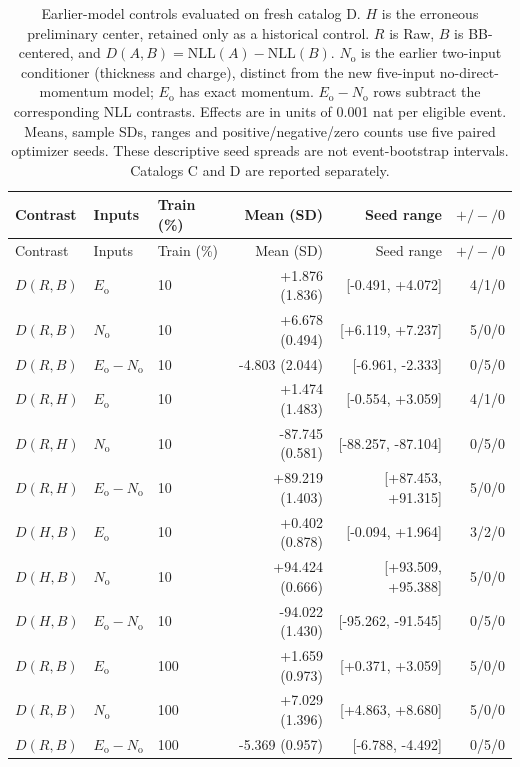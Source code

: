 \begingroup
\small
\setlength{\tabcolsep}{3pt}
\begin{longtable}{lllrrr}
\caption{Earlier-model controls evaluated on fresh catalog D. $H$ is the erroneous preliminary center, retained only as a historical control. $R$ is Raw, $B$ is BB-centered, and $D(A,B)=\mathrm{NLL}(A)-\mathrm{NLL}(B)$. $N_{\mathrm{o}}$ is the earlier two-input conditioner (thickness and charge), distinct from the new five-input no-direct-momentum model; $E_{\mathrm{o}}$ has exact momentum. $E_{\mathrm{o}}-N_{\mathrm{o}}$ rows subtract the corresponding NLL contrasts. Effects are in units of 0.001 nat per eligible event. Means, sample SDs, ranges and positive/negative/zero counts use five paired optimizer seeds. These descriptive seed spreads are not event-bootstrap intervals. Catalogs C and D are reported separately.}\label{tab:editorial-secondary-historical-D}\\
\toprule Contrast & Inputs & Train (\%) & Mean (SD) & Seed range & $+/-/0$\\ \midrule \endfirsthead
\toprule Contrast & Inputs & Train (\%) & Mean (SD) & Seed range & $+/-/0$\\ \midrule \endhead
$D(R,B)$ & $E_{\mathrm{o}}$ & 10 & +1.876 (1.836) & [-0.491, +4.072] & 4/1/0\\
$D(R,B)$ & $N_{\mathrm{o}}$ & 10 & +6.678 (0.494) & [+6.119, +7.237] & 5/0/0\\
$D(R,B)$ & $E_{\mathrm{o}}-N_{\mathrm{o}}$ & 10 & -4.803 (2.044) & [-6.961, -2.333] & 0/5/0\\
$D(R,H)$ & $E_{\mathrm{o}}$ & 10 & +1.474 (1.483) & [-0.554, +3.059] & 4/1/0\\
$D(R,H)$ & $N_{\mathrm{o}}$ & 10 & -87.745 (0.581) & [-88.257, -87.104] & 0/5/0\\
$D(R,H)$ & $E_{\mathrm{o}}-N_{\mathrm{o}}$ & 10 & +89.219 (1.403) & [+87.453, +91.315] & 5/0/0\\
$D(H,B)$ & $E_{\mathrm{o}}$ & 10 & +0.402 (0.878) & [-0.094, +1.964] & 3/2/0\\
$D(H,B)$ & $N_{\mathrm{o}}$ & 10 & +94.424 (0.666) & [+93.509, +95.388] & 5/0/0\\
$D(H,B)$ & $E_{\mathrm{o}}-N_{\mathrm{o}}$ & 10 & -94.022 (1.430) & [-95.262, -91.545] & 0/5/0\\
\midrule
$D(R,B)$ & $E_{\mathrm{o}}$ & 100 & +1.659 (0.973) & [+0.371, +3.059] & 5/0/0\\
$D(R,B)$ & $N_{\mathrm{o}}$ & 100 & +7.029 (1.396) & [+4.863, +8.680] & 5/0/0\\
$D(R,B)$ & $E_{\mathrm{o}}-N_{\mathrm{o}}$ & 100 & -5.369 (0.957) & [-6.788, -4.492] & 0/5/0\\

\end{longtable}
